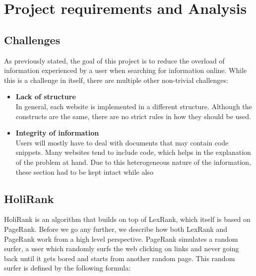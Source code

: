 \section{Project requirements and Analysis}\label{sec:requirementsAndAnalysis}


\subsection{Challenges}
As previously stated, the goal of this project is to reduce the overload of information experienced by a user when searching for information online. While this is a challenge in itself, there are multiple other non-trivial challenges:

\begin{itemize}
\item {\bf Lack of structure}\label{sec:lackOfStructure}\\
In general, each website is implemented in a different structure. Although the constructs are the same, there are no strict rules in how they should be used. %
\item {\bf Integrity of information}\\
Users will mostly have to deal with documents that may contain code snippets. Many websites tend to include code, which helps in the explanation of the problem at hand. Due to this heterogeneous nature of the information, these section had to be kept intact while also

\end{itemize}

\subsection{HoliRank}

HoliRank\cite{Ponz2017a} is an algorithm that builds on top of LexRank\cite{Erkan:2004:LGL:1622487.1622501}, which itself is based on PageRank\cite{ilprints422}. 
Before we go any further, we describe how both LexRank\cite{Erkan:2004:LGL:1622487.1622501} and PageRank\cite{ilprints422} work from a high level perspective. PageRank\cite{ilprints422} simulates a random surfer, a user which randomly surfs the web clicking on links and never going back until it gets bored and starts from another random page. This random surfer is defined by the following formula:


